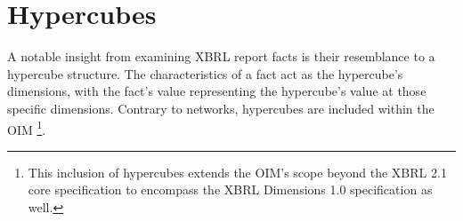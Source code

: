 \section{Hypercubes}
\label{sec:hypercubes}

A notable insight from examining XBRL report facts is their resemblance to a hypercube structure.
The characteristics of a fact act as the hypercube's dimensions, with the fact's value representing the hypercube's value at those specific dimensions.
Contrary to networks, hypercubes are included within the OIM
\footnote{This inclusion of hypercubes extends the OIM's\cite{oim} scope beyond the XBRL 2.1 core specification\cite{xbrl21} to encompass the XBRL Dimensions 1.0 specification\cite{xbrl_dimensions} as well.}.



